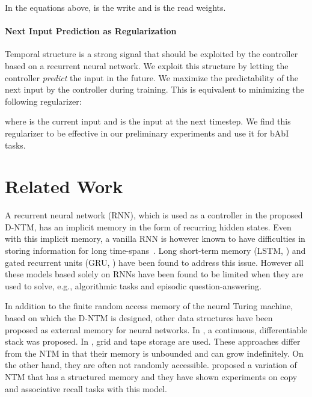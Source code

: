 \documentclass[12pt]{article}
\begin{document}
In the equations above,  is the write and  is the read weights.

\paragraph{Next Input Prediction as Regularization}

Temporal structure is a strong signal that should be exploited by the controller based on a recurrent neural network. We exploit this structure by letting the controller {\it predict} the input in the future. We maximize the predictability of the next input by the controller during training. This is equivalent to minimizing the following regularizer:

where  is the current input and  is the input at the next timestep. We find this regularizer to be effective in our preliminary experiments and use it for bAbI tasks.

\section{Related Work}

A recurrent neural network (RNN), which is used as a controller in the proposed
D-NTM, has an implicit memory in the form of recurring hidden states. Even with
this implicit memory, a vanilla RNN is however known to have difficulties in
storing information for long time-spans~\citep{bengio1994learning,hochreiter1991untersuchungen}. Long short-term memory
(LSTM, \citep{lstm1997}) and gated recurrent units (GRU, \citep{cho2014learning})
have been found to address this issue. However all these models based solely on
RNNs have been found to be limited when they are used to solve, e.g.,
algorithmic tasks and episodic question-answering. 

In addition to the finite random access memory of the neural Turing machine,
based on which the D-NTM is designed, other data structures have been proposed
as external memory for neural networks. In \citep{sun1997neural,grefenstette2015learning,joulin2015inferring}, a continuous,
differentiable stack was proposed. In \citep{zaremba2015learning,rlntm}, grid and
tape storage are used. These approaches differ from the NTM in that their
memory is unbounded and can grow indefinitely. On the other hand, they are
often not randomly accessible. \cite{zhang2015structured} proposed a variation of NTM
that has a structured memory and they have shown experiments on copy and associative
recall tasks with this model.
\end{document}
